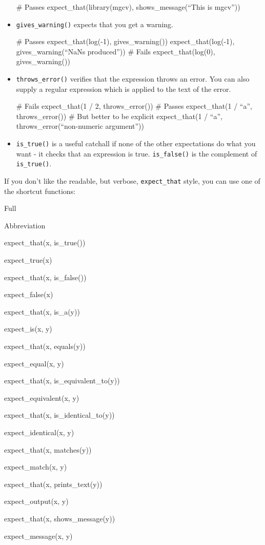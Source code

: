 \begin{itemize}
  \# Passes expect\_that(library(mgcv), shows\_message(``This is
  mgcv''))
\item
  \texttt{gives\_warning()} expects that you get a warning.

  \# Passes expect\_that(log(-1), gives\_warning())
  expect\_that(log(-1), gives\_warning(``NaNs produced'')) \# Fails
  expect\_that(log(0), gives\_warning())
\item
  \texttt{throws\_error()} verifies that the expression throws an error.
  You can also supply a regular expression which is applied to the text
  of the error.

  \# Fails expect\_that(1 / 2, throws\_error()) \# Passes expect\_that(1
  / ``a'', throws\_error()) \# But better to be explicit expect\_that(1
  / ``a'', throws\_error(``non-numeric argument''))
\item
  \texttt{is\_true()} is a useful catchall if none of the other
  expectations do what you want - it checks that an expression is true.
  \texttt{is\_false()} is the complement of \texttt{is\_true()}.
\end{itemize}

If you don't like the readable, but verbose, \texttt{expect\_that}
style, you can use one of the shortcut functions:

Full

Abbreviation

expect\_that(x, is\_true())

expect\_true(x)

expect\_that(x, is\_false())

expect\_false(x)

expect\_that(x, is\_a(y))

expect\_is(x, y)

expect\_that(x, equals(y))

expect\_equal(x, y)

expect\_that(x, is\_equivalent\_to(y))

expect\_equivalent(x, y)

expect\_that(x, is\_identical\_to(y))

expect\_identical(x, y)

expect\_that(x, matches(y))

expect\_match(x, y)

expect\_that(x, prints\_text(y))

expect\_output(x, y)

expect\_that(x, shows\_message(y))

expect\_message(x, y)

